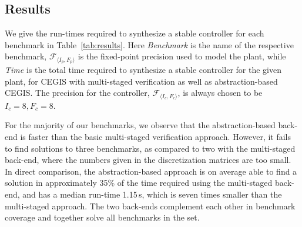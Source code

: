 \documentclass[runningheads,a4paper]{llncs}
\begin{document}
\subsection{Results}

We give the run-times required to synthesize a stable controller for each
benchmark in Table~\ref{tab:results}.  Here \textit{Benchmark} is the name
of the respective benchmark, $\mathcal{F}_{\langle I_p,F_p \rangle}$ is the
fixed-point precision used to model the plant, while \textit{Time} is the
total time required to synthesize a stable controller for the given plant,
for CEGIS with multi-staged verification as well as abstraction-based CEGIS. 
The precision for the controller, $\mathcal{F}_{\langle I_c,F_c \rangle}$,
is always chosen to be $I_c = 8, F_c = 8$.

For the majority of our benchmarks, we observe that the abstraction-based
back-end is faster than the basic multi-staged verification approach. 
However, it fails to find solutions to three benchmarks, as compared to two
with the multi-staged back-end, where the numbers given in the
discretization matrices are too small.  In direct comparison, the
abstraction-based approach is on average able to find a solution in
approximately 35\% of the time required using the multi-staged back-end, and
has a median run-time 1.15\,s, which is seven times smaller than the
multi-staged approach.  The two back-ends complement each other in benchmark
coverage and together solve all benchmarks in the set.
\end{document}
